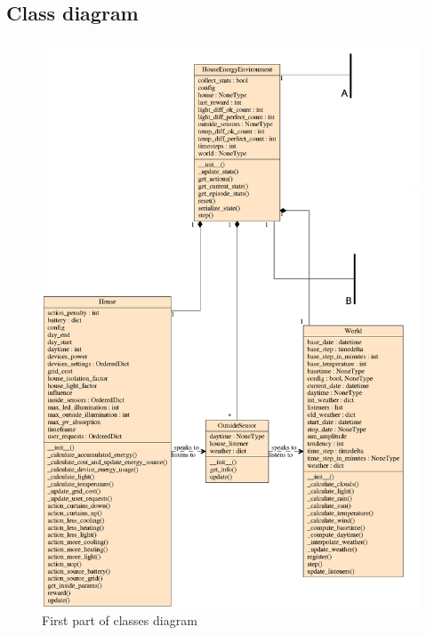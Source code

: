 \documentclass{article}
\begin{document}
\subsection{Class diagram}
\begin{figure}[H]
    \begin{center}
        \includegraphics[scale=0.4]{classes1.png}
        \caption{First part of classes diagram}
    \end{center}
\end{figure}
\end{document}

